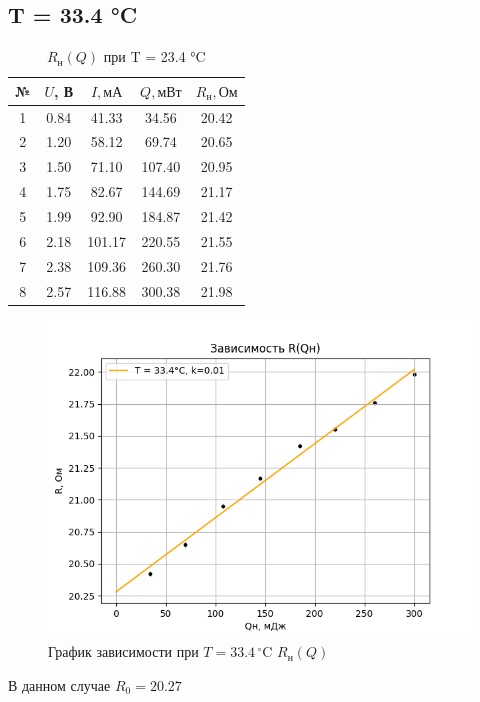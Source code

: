 \documentclass[a4paper, 10pt, twocolumn]{article}
\begin{document}
    \subsection{T = 33.4 °C}
    \begin{table}[H]
        \centering
        \begin{tabular}{|c|c|c|c|c|} \hline
        № & $U$, В & $I, \text{мА}$ & $ Q, \text{мВт} $ & $R_\text{н}, \text{Ом}$ \\ \hline
        1 & 0.84 & 41.33  & 34.56  & 20.42 \\ \hline
        2 & 1.20 & 58.12  & 69.74  & 20.65 \\ \hline
        3 & 1.50 & 71.10  & 107.40 & 20.95 \\ \hline
        4 & 1.75 & 82.67  & 144.69 & 21.17 \\ \hline
        5 & 1.99 & 92.90  & 184.87 & 21.42 \\ \hline
        6 & 2.18 & 101.17 & 220.55 & 21.55 \\ \hline
        7 & 2.38 & 109.36 & 260.30 & 21.76 \\ \hline
        8 & 2.57 & 116.88 & 300.38 & 21.98 \\ \hline
        \end{tabular}
        \caption{$R_\text{н}(Q)$ при T = 23.4 °C}
    \end{table}
    \begin{figure}[H]
        \centering
        \includegraphics[width=1\linewidth]{graphs/figure2.png}
        \begin{center}
            \caption{График зависимости при $T =33.4 \, ^\circ\text{C}$ $R_\text{н}(Q)$}
        \end{center}
    \end{figure}
    В данном случае $R_0 = 20.27$
\end{document}
